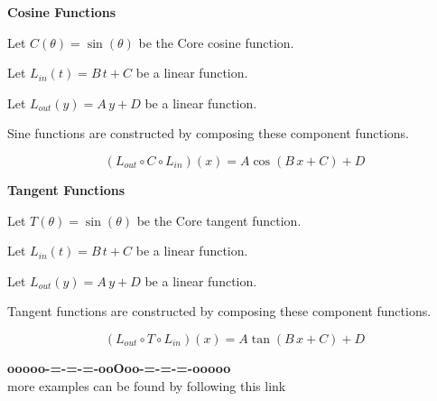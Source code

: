 \documentclass{ximera}
\begin{document}
\begin{idea} \textbf{\textcolor{blue!55!black}{Cosine Functions}}


Let $C(\theta) = \sin(\theta)$ be the Core cosine function.

Let $L_{in}(t) = B \, t + C$ be a linear function.

Let $L_{out}(y) = A \, y + D$ be a linear function.



Sine functions are constructed by composing these component functions.


\[
(L_{out} \circ C \circ L_{in})(x) = A \cos(B \,x + C) + D
\]




\end{idea}













\begin{idea} \textbf{\textcolor{blue!55!black}{Tangent Functions}}


Let $T(\theta) = \sin(\theta)$ be the Core tangent function.

Let $L_{in}(t) = B \, t + C$ be a linear function.

Let $L_{out}(y) = A \, y + D$ be a linear function.



Tangent functions are constructed by composing these component functions.


\[
(L_{out} \circ T \circ L_{in})(x) = A \tan(B \,x + C) + D
\]




\end{idea}

























\begin{center}
\textbf{\textcolor{green!50!black}{ooooo-=-=-=-ooOoo-=-=-=-ooooo}} \\

more examples can be found by following this link\\ 

\end{center}
\end{document}

